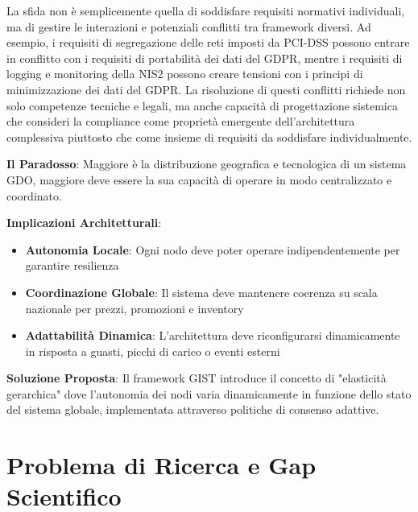 La sfida non è semplicemente quella di soddisfare requisiti normativi individuali, ma di gestire le interazioni e potenziali conflitti tra framework diversi. 
Ad esempio, i requisiti di segregazione delle reti imposti da PCI-DSS possono entrare in conflitto con i requisiti di portabilità dei dati del GDPR, mentre i requisiti di logging e monitoring della NIS2 possono creare tensioni con i principi di minimizzazione dei dati del GDPR. 
La risoluzione di questi conflitti richiede non solo competenze tecniche e legali, ma anche capacità di progettazione sistemica che consideri la compliance come proprietà emergente dell'architettura complessiva piuttosto che come insieme di requisiti da soddisfare individualmente.

\begin{tcolorbox}[
    colback=blue!5!white,
    colframe=blue!75!black,
    title={\textbf{Innovation Box 1.1:} Il Paradosso della Complessità Sistemica nella GDO},
    fonttitle=\bfseries,
    boxrule=1.5pt,
    arc=2mm,
    breakable
]
\textbf{Il Paradosso}: Maggiore è la distribuzione geografica e tecnologica di un sistema GDO, maggiore deve essere la sua capacità di operare in modo centralizzato e coordinato.

\vspace{0.3cm}
\textbf{Implicazioni Architetturali}:
\begin{itemize}
    \item \textbf{Autonomia Locale}: Ogni nodo deve poter operare indipendentemente per garantire resilienza
    \item \textbf{Coordinazione Globale}: Il sistema deve mantenere coerenza su scala nazionale per prezzi, promozioni e inventory
    \item \textbf{Adattabilità Dinamica}: L'architettura deve riconfigurarsi dinamicamente in risposta a guasti, picchi di carico o eventi esterni
\end{itemize}

\vspace{0.3cm}
\textbf{Soluzione Proposta}: Il framework GIST introduce il concetto di "elasticità gerarchica" dove l'autonomia dei nodi varia dinamicamente in funzione dello stato del sistema globale, implementata attraverso politiche di consenso adattive.
\end{tcolorbox}

\section{Problema di Ricerca e Gap Scientifico}

